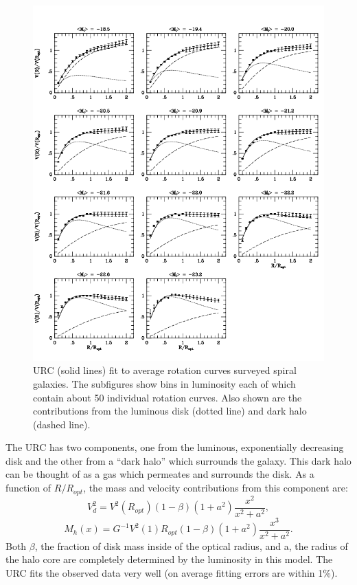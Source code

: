 \begin{figure}[h!]
\centering
\includegraphics[width=150mm]{Figures/persic_salucci_urc}
\caption{URC (solid lines) fit to average rotation curves surveyed spiral galaxies. The subfigures show bins in luminosity each of which contain about 50 individual rotation curves. Also shown are the contributions from the luminous disk (dotted line) and dark halo (dashed line)\cite{persic}.}
\end{figure}



The URC has two components, one from the luminous, exponentially decreasing disk and the other from a ``dark halo'' which surrounds the galaxy. This dark halo can be thought of as a gas which permeates and surrounds the disk. As a function of $R/R_{opt}$, the mass and velocity contributions from this component are:
\begin{equation}\label{eq:halo_velocity}
V_{d}^{2}=V^{2}(R_{opt})(1-\beta)(1+a^{2}) \frac{x^{2}}{x^{2}+a^{2}},
\end{equation}
\begin{equation}\label{eq:halo_velocity}
M_{h}(x)=G^{-1}V^{2}(1)R_{opt}(1-\beta)(1+a^{2}) \frac{x^{3}}{x^{2}+a^{2}}.
\end{equation}
Both $\beta$, the fraction of disk mass inside of the optical radius, and a, the radius of the halo core are completely determined by the luminosity in this model. The URC fits the observed data very well (on average fitting errors are within 1\%).


